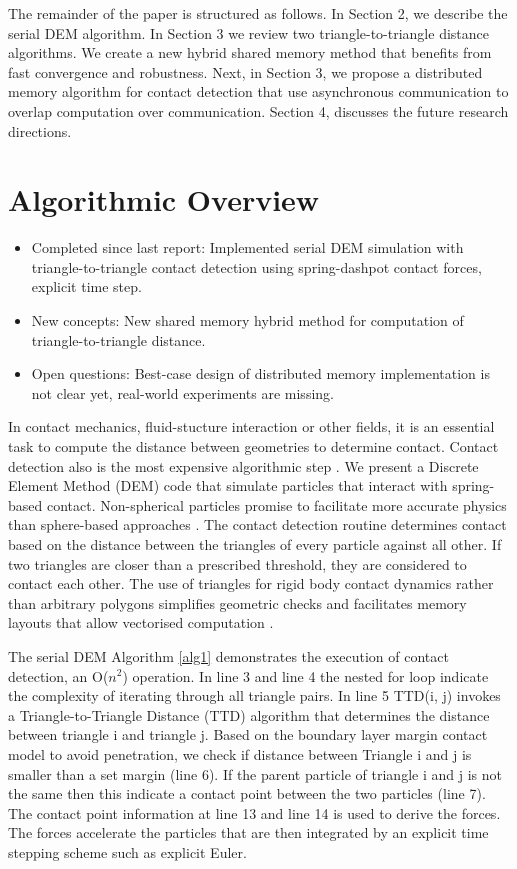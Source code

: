 \documentclass[times,12pt]{article}
\begin{document}
The remainder of the paper is structured as follows. In Section 2, we describe the serial DEM  algorithm. In Section 3 we review two triangle-to-triangle distance algorithms. We create a new hybrid shared memory method that benefits from fast convergence and robustness. Next, in Section 3, we propose a distributed memory algorithm for contact detection that use asynchronous communication to overlap computation over communication. Section 4, discusses the future research directions.

\section{Algorithmic Overview}
\vspace{5mm}
\begin{itemize}
\item Completed since last report: Implemented serial DEM simulation with triangle-to-triangle contact detection using spring-dashpot contact forces, explicit time step.
\item New concepts: New shared memory hybrid method for computation of triangle-to-triangle distance.
\item Open questions: Best-case design of distributed memory implementation is not clear yet, real-world experiments are missing.
\end{itemize}

In contact mechanics, fluid-stucture interaction or other fields, it is an essential task to compute the distance between geometries to determine contact. Contact detection also is the most expensive algorithmic step \cite{Koziara2010, Wachs2012}. We present a Discrete Element Method (DEM) code that simulate particles that interact with spring-based contact. Non-spherical particles promise to facilitate more accurate physics than sphere-based approaches \cite{AlonsoMarroqu2013, Girolami2012}. The contact detection routine determines contact based on the distance between the triangles of every particle against all other. If two triangles are closer than a prescribed threshold, they are considered to contact each other. The use of triangles for rigid body contact dynamics rather than arbitrary polygons simplifies geometric checks and facilitates memory layouts that allow vectorised computation \cite{Eichenberger2004, Juurlink, Krestenitis2015, Krestenitis2016}.

The serial DEM Algorithm \ref{alg1} demonstrates the execution of contact detection, an O($n^2$) operation. In line 3 and line 4 the nested for loop indicate the complexity of iterating through all triangle pairs. In line 5 TTD(i, j) invokes a Triangle-to-Triangle Distance (TTD) algorithm that determines the distance between triangle i and triangle j. Based on the boundary layer margin contact model \cite{Krestenitis2015} to avoid penetration, we check if distance between Triangle i and j is smaller than a set margin (line 6). If the parent particle of triangle i and j is not the same then this indicate a contact point between the two particles (line 7). The contact point information at line 13 and line 14 is used to derive the forces. The forces accelerate the particles that are then integrated by an explicit time stepping scheme such as explicit Euler.
\end{document}
